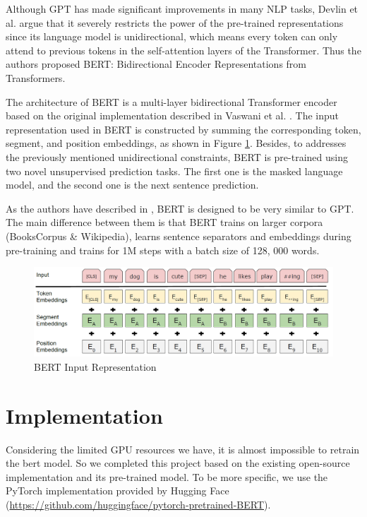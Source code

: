 \documentclass[10pt,journal,compsoc]{IEEEtran}
\begin{document}
Although GPT has made significant improvements in many NLP tasks, Devlin et al. \cite{devlin2018bert} argue that it severely restricts the power of the pre-trained representations since its language model is unidirectional, which means every token can only attend to previous tokens in the self-attention layers of the Transformer. Thus the authors proposed BERT: Bidirectional Encoder Representations from Transformers. 

The architecture of BERT is a multi-layer bidirectional Transformer encoder based on the original implementation described in Vaswani et al. \cite{vaswani2017attention}. The input representation used in BERT is constructed by summing the corresponding token, segment, and position embeddings, as shown in Figure \ref{fig:bert_input_representation}. Besides, to addresses the previously mentioned unidirectional constraints, BERT is pre-trained using two novel unsupervised prediction tasks. The first one is the masked language model, and the second one is the next sentence prediction.

As the authors have described in \cite{devlin2018bert}, BERT is designed to be very similar to GPT. The main difference between them is that BERT trains on larger corpora (BooksCorpus \& Wikipedia), learns sentence separators and embeddings during pre-training and trains for 1M steps with a batch size of 128, 000 words.
 
\begin{figure}[!t]
  \centering
  \includegraphics[width=1\linewidth]{images/bert_input_representation.png}
  \caption{BERT Input Representation}
  \label{fig:bert_input_representation}
\end{figure}


\section{Implementation}
\label{sec:implementation}

Considering the limited GPU resources we have, it is almost impossible to retrain the bert model. So we completed this project based on the existing open-source implementation and its pre-trained model. To be more specific, we use the PyTorch implementation provided by Hugging Face (\url{https://github.com/huggingface/pytorch-pretrained-BERT}).
\end{document}
